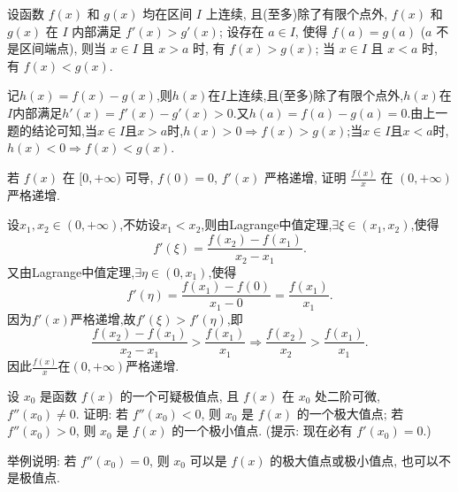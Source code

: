 \begin{exercise}[3.3.17]\label{ex:3.3.17}
    设函数 $f(x)$ 和 $g(x)$ 均在区间 $I$ 上连续, 且(至多)除了有限个点外, $f(x)$ 和 $g(x)$ 在 $I$ 内部满足 $f'(x) > g'(x)$; 设存在 $a \in I$, 使得 $f(a)=g(a)$ ($a$ 不是区间端点), 则当 $x \in I$ 且 $x>a$ 时, 有 $f(x)>g(x)$; 当 $x \in I$ 且 $x<a$ 时, 有 $f(x)<g(x)$.
\end{exercise}

\begin{solution}
    记$h(x) = f(x) - g(x)$,则$h(x)$在$I$上连续,且(至多)除了有限个点外,$h(x)$在$I$内部满足$h'(x) = f'(x) - g'(x) > 0$.又$h(a) = f(a) - g(a) = 0$.由上一题的结论可知,当$x \in I$且$x > a$时,$h(x) > 0 \Rightarrow f(x) > g(x)$;当$x \in I$且$x < a$时,$h(x) < 0 \Rightarrow f(x) < g(x)$.
\end{solution}

\begin{exercise}[3.3.18]
    若 $f(x)$ 在 $[0, +\infty)$ 可导, $f(0)=0$, $f'(x)$ 严格递增, 证明 $\frac{f(x)}{x}$ 在 $(0, +\infty)$ 严格递增.
\end{exercise}

\begin{solution}
    设$x_1,x_2 \in (0,+\infty)$,不妨设$x_1 < x_2$,则由Lagrange中值定理,$\exists \xi \in (x_1,x_2)$,使得
    $$
        f'(\xi) = \frac{f(x_2)-f(x_1)}{x_2 - x_1}.
    $$
    又由Lagrange中值定理,$\exists \eta \in (0,x_1)$,使得
    $$
        f'(\eta) = \frac{f(x_1)-f(0)}{x_1 - 0} = \frac{f(x_1)}{x_1}.
    $$
    因为$f'(x)$严格递增,故$f'(\xi) > f'(\eta)$,即
    $$
        \frac{f(x_2)-f(x_1)}{x_2 - x_1} > \frac{f(x_1)}{x_1} \Rightarrow \frac{f(x_2)}{x_2} > \frac{f(x_1)}{x_1}.
    $$
    因此$\frac{f(x)}{x}$在$(0,+\infty)$严格递增.
\end{solution}

\begin{exercise}[3.3.19]
    设 $x_0$ 是函数 $f(x)$ 的一个可疑极值点, 且 $f(x)$ 在 $x_0$ 处二阶可微, $f''(x_0) \ne 0$. 证明: 若 $f''(x_0)<0$, 则 $x_0$ 是 $f(x)$ 的一个极大值点; 若 $f''(x_0)>0$, 则 $x_0$ 是 $f(x)$ 的一个极小值点. (提示: 现在必有 $f'(x_0)=0$.)

    举例说明: 若 $f''(x_0)=0$, 则 $x_0$ 可以是 $f(x)$ 的极大值点或极小值点, 也可以不是极值点.
\end{exercise}

